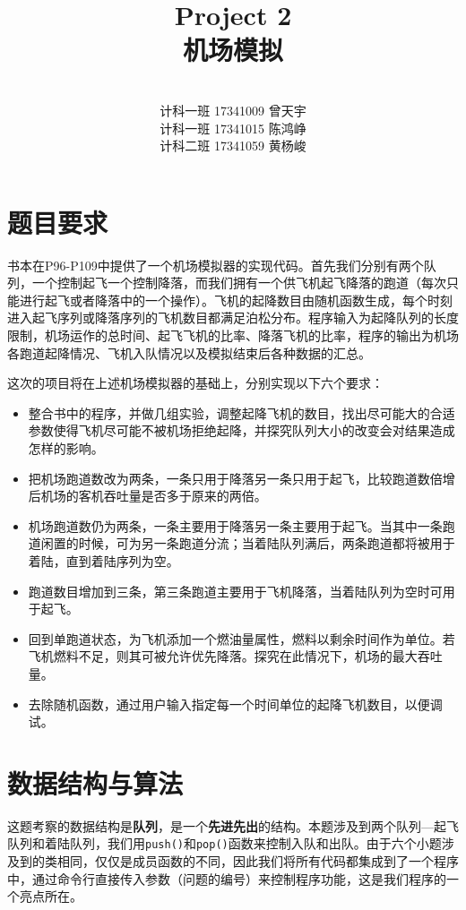 \documentclass[12pt,UTF8]{ctexart}
\title{{\Huge Project 2\\机场模拟}}
\author{\vspace{200pt}\quad\\
计科一班 17341009 曾天宇\\
计科一班 17341015 陈鸿峥\\
计科二班 17341059 黄杨峻}
\date{}
\begin{document}
\begin{spacing}{1.4}

\clearpage\maketitle
\thispagestyle{empty}

\newpage
\setcounter{page}{1}
\section{题目要求}
	书本在P96-P109中提供了一个机场模拟器的实现代码。首先我们分别有两个队列，一个控制起飞一个控制降落，而我们拥有一个供飞机起飞降落的跑道（每次只能进行起飞或者降落中的一个操作）。飞机的起降数目由随机函数生成，每个时刻进入起飞序列或降落序列的飞机数目都满足泊松分布。程序输入为起降队列的长度限制，机场运作的总时间、起飞飞机的比率、降落飞机的比率，程序的输出为机场各跑道起降情况、飞机入队情况以及模拟结束后各种数据的汇总。

	这次的项目将在上述机场模拟器的基础上，分别实现以下六个要求：
	
	\begin{itemize}
		\item 整合书中的程序，并做几组实验，调整起降飞机的数目，找出尽可能大的合适参数使得飞机尽可能不被机场拒绝起降，并探究队列大小的改变会对结果造成怎样的影响。
		\item 把机场跑道数改为两条，一条只用于降落另一条只用于起飞，比较跑道数倍增后机场的客机吞吐量是否多于原来的两倍。
		\item 机场跑道数仍为两条，一条主要用于降落另一条主要用于起飞。当其中一条跑道闲置的时候，可为另一条跑道分流；当着陆队列满后，两条跑道都将被用于着陆，直到着陆序列为空。
		\item 跑道数目增加到三条，第三条跑道主要用于飞机降落，当着陆队列为空时可用于起飞。
		\item 回到单跑道状态，为飞机添加一个燃油量属性，燃料以剩余时间作为单位。若飞机燃料不足，则其可被允许优先降落。探究在此情况下，机场的最大吞吐量。
		\item 去除随机函数，通过用户输入指定每一个时间单位的起降飞机数目，以便调试。
	\end{itemize}
	
\section{数据结构与算法}
	这题考察的数据结构是\textbf{队列}，是一个\textbf{先进先出}的结构。本题涉及到两个队列---起飞队列和着陆队列，我们用\verb'push()'和\verb'pop()'函数来控制入队和出队。由于六个小题涉及到的类相同，仅仅是成员函数的不同，因此我们将所有代码都集成到了一个程序中，通过命令行直接传入参数（问题的编号）来控制程序功能，这是我们程序的一个亮点所在。
	

\end{spacing}
\end{document}

